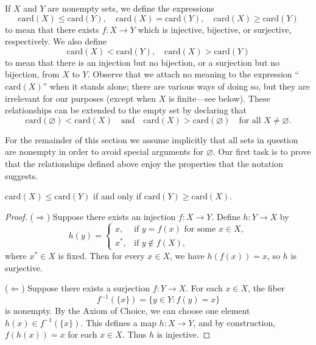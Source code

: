 \begin{definition}
    If $X$ and $Y$ are nonempty sets, we define the expressions
\[
\mathrm{card}(X) \leq \mathrm{card}(Y), \quad
\mathrm{card}(X) = \mathrm{card}(Y), \quad
\mathrm{card}(X) \geq \mathrm{card}(Y)
\]
to mean that there exists $f : X \to Y$ which is injective, bijective, or surjective,
respectively. We also define
\[
\mathrm{card}(X) < \mathrm{card}(Y), \quad
\mathrm{card}(X) > \mathrm{card}(Y)
\]
to mean that there is an injection but no bijection, or a surjection but no bijection,
from $X$ to $Y$. Observe that we attach no meaning to the expression
``$\mathrm{card}(X)$'' when it stands alone; there are various ways of doing so, but
they are irrelevant for our purposes (except when $X$ is finite---see below). These
relationships can be extended to the empty set by declaring that
\[
\mathrm{card}(\varnothing) < \mathrm{card}(X)
\quad\text{and}\quad
\mathrm{card}(X) > \mathrm{card}(\varnothing)
\quad\text{for all } X \neq \varnothing.
\]

For the remainder of this section we assume implicitly that all sets in question are
nonempty in order to avoid special arguments for $\varnothing$. Our first task is to prove
that the relationships defined above enjoy the properties that the notation suggests.
\end{definition}

\begin{prop}
$\mathrm{card}(X) \le \mathrm{card}(Y)$ if and only if $\mathrm{card}(Y) \ge \mathrm{card}(X)$.
\end{prop}

\begin{proof}
($\Rightarrow$) Suppose there exists an injection $f:X \to Y$. 
Define $h:Y \to X$ by
\[
   h(y) = 
   \begin{cases}
      x, & \text{if } y = f(x) \text{ for some } x \in X, \\
      x^*, & \text{if } y \notin f(X),
   \end{cases}
\]
where $x^*\in X$ is fixed. Then for every $x\in X$, we have $h(f(x))=x$, so $h$ is surjective.


($\Leftarrow$) Suppose there exists a surjection $f:Y \to X$. 
For each $x\in X$, the fiber 
\[
   f^{-1}(\{x\}) = \{ y \in Y : f(y)=x\}
\]
is nonempty. By the Axiom of Choice, we can choose one element $h(x)\in f^{-1}(\{x\})$. 
This defines a map $h:X \to Y$, and by construction, $f(h(x))=x$ for each $x\in X$. 
Thus $h$ is injective.
\end{proof}

